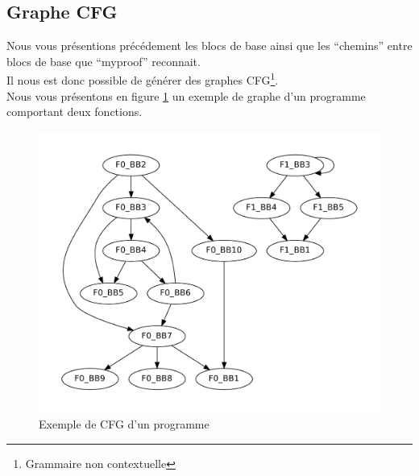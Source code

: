 \subsection{Graphe CFG}

Nous vous présentions précédement les blocs de base ainsi que les ``chemins'' entre blocs de base que ``myproof'' reconnait.\\

Il nous est donc possible de générer des graphes CFG\footnote{Grammaire non contextuelle}.\\

Nous vous présentons en figure \ref{fig:cfg} un exemple de graphe d'un programme comportant deux fonctions.

\begin{figure}[here]
  \centering
  \includegraphics[scale=0.50]{images/t-test.pdf}
  \caption{Exemple de CFG d'un programme}
  \label{fig:cfg}
\end{figure}

